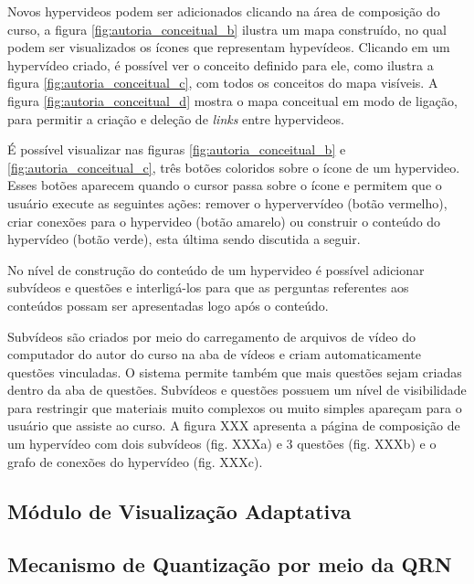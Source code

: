 Novos hypervideos podem ser adicionados clicando na área de composição do curso, a figura \ref{fig:autoria_conceitual_b} ilustra um mapa construído, no qual podem ser visualizados os ícones que representam hypevídeos. Clicando em um hypervídeo criado, é possível ver o conceito definido para ele, como ilustra a figura \ref{fig:autoria_conceitual_c}, com todos os conceitos do mapa visíveis. A figura \ref{fig:autoria_conceitual_d}  mostra o mapa conceitual em modo de ligação, para permitir a criação e deleção de \textit{links} entre hypervideos.

É possível visualizar nas figuras \ref{fig:autoria_conceitual_b} e \ref{fig:autoria_conceitual_c}, três botões coloridos sobre o ícone de um hypervideo. Esses botões aparecem quando o cursor passa sobre o ícone e permitem que o usuário execute as seguintes ações: remover o hypervervídeo (botão vermelho), criar conexões para o hypervideo (botão amarelo) ou construir o conteúdo do hypervídeo (botão verde), esta última sendo discutida a seguir. 

No nível de construção do conteúdo de um hypervideo é possível adicionar subvídeos e questões e interligá-los para que as perguntas referentes aos conteúdos possam ser apresentadas logo após o conteúdo. 

Subvídeos são criados por meio do carregamento de arquivos de vídeo do computador do autor do curso na aba de vídeos e criam automaticamente questões vinculadas. O sistema permite também que mais questões sejam criadas dentro da aba de questões. Subvídeos e questões possuem um nível de visibilidade para restringir que materiais muito complexos ou muito simples apareçam para o usuário que assiste ao curso. A figura XXX apresenta a página de composição de um hypervídeo com dois subvídeos (fig. XXXa) e 3 questões (fig. XXXb) e o grafo de conexões do hypervídeo (fig. XXXc).
\subsection{Módulo de Visualização Adaptativa}

\subsection{Mecanismo de Quantização por meio da QRN}